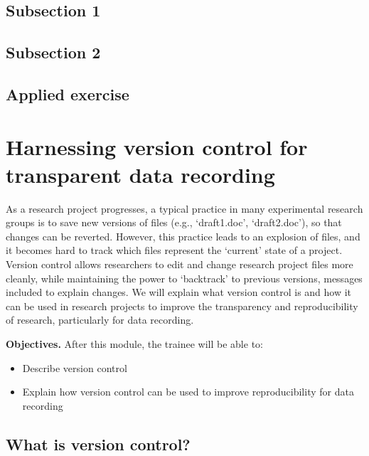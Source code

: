 \documentclass[]{tufte-book}
\providecommand{\tightlist}{%
  \setlength{\itemsep}{0pt}\setlength{\parskip}{0pt}}
\begin{document}
\hypertarget{subsection-1}{%
\subsection{Subsection 1}\label{subsection-1}}

\hypertarget{subsection-2}{%
\subsection{Subsection 2}\label{subsection-2}}

\hypertarget{applied-exercise}{%
\subsection{Applied exercise}\label{applied-exercise}}

\hypertarget{harnessing-version-control-for-transparent-data-recording}{%
\section{Harnessing version control for transparent data recording}\label{harnessing-version-control-for-transparent-data-recording}}

As a research project progresses, a typical practice in many experimental
research groups is to save new versions of files (e.g., `draft1.doc',
`draft2.doc'), so that changes can be reverted. However, this practice leads to
an explosion of files, and it becomes hard to track which files represent the
`current' state of a project. Version control allows researchers to edit and
change research project files more cleanly, while maintaining the power to
`backtrack' to previous versions, messages included to explain changes. We will
explain what version control is and how it can be used in research projects to
improve the transparency and reproducibility of research, particularly for data
recording.

\textbf{Objectives.} After this module, the trainee will be able to:

\begin{itemize}
\tightlist
\item
  Describe version control\\
\item
  Explain how version control can be used to improve reproducibility
  for data recording
\end{itemize}

\hypertarget{what-is-version-control}{%
\subsection{What is version control?}\label{what-is-version-control}}
\end{document}
